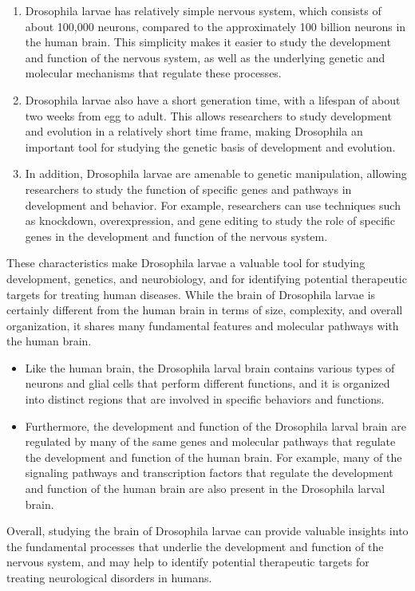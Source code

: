 \documentclass{book}
\begin{document}
	
	\begin{enumerate}
		\item Drosophila larvae has relatively simple nervous system, which consists of about 100,000 neurons, compared to the approximately 100 billion neurons in the human brain. This simplicity makes it easier to study the development and function of the nervous system, as well as the underlying genetic and molecular mechanisms that regulate these processes.
		\item Drosophila larvae also have a short generation time, with a lifespan of about two weeks from egg to adult. This allows researchers to study development and evolution in a relatively short time frame, making Drosophila an important tool for studying the genetic basis of development and evolution.
		\item In addition, Drosophila larvae are amenable to genetic manipulation, allowing researchers to study the function of specific genes and pathways in development and behavior. For example, researchers can use techniques such as knockdown, overexpression, and gene editing to study the role of specific genes in the development and function of the nervous system.
	\end{enumerate}	
	
	These characteristics make Drosophila larvae a valuable tool for studying development, genetics, and neurobiology, and for identifying potential therapeutic targets for treating human diseases. While the brain of Drosophila larvae is certainly different from the human brain in terms of size, complexity, and overall organization, it shares many fundamental features and molecular pathways with the human brain.
	\begin{itemize}
		\item Like the human brain, the Drosophila larval brain contains various types of neurons and glial cells that perform different functions, and it is organized into distinct regions that are involved in specific behaviors and functions.
		\item Furthermore, the development and function of the Drosophila larval brain are regulated by many of the same genes and molecular pathways that regulate the development and function of the human brain. For example, many of the signaling pathways and transcription factors that regulate the development and function of the human brain are also present in the Drosophila larval brain.
	\end{itemize}
	
	Overall, studying the brain of Drosophila larvae can provide valuable insights into the fundamental processes that underlie the development and function of the nervous system, and may help to identify potential therapeutic targets for treating neurological disorders in humans.
	
\end{document}
